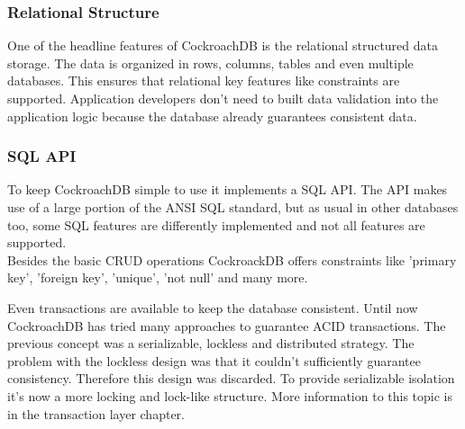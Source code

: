 \subsubsection{Relational Structure}
One of the headline features of CockroachDB is the relational structured data storage. The data is organized in rows, columns, tables and even multiple databases. This ensures that relational key features like constraints are supported. Application developers don't need to built data validation into the application logic because the database already guarantees consistent data.

\subsubsection{SQL API}
To keep CockroachDB simple to use it implements a SQL API. The API makes use of a large portion of the ANSI SQL standard, but
as usual in other databases too, some SQL features are differently implemented and not all features are supported. \\
Besides the basic CRUD operations CockroackDB offers constraints like 'primary key', 'foreign key', 'unique', 'not null' and
many more.

Even transactions are available to keep the database consistent. Until now CockroachDB has tried many approaches to guarantee
ACID transactions. The previous concept was a serializable, lockless and distributed strategy. 
The problem with the lockless design was that it couldn't sufficiently guarantee consistency. Therefore this design was 
discarded. To provide serializable isolation it's now a more locking and lock-like structure. 
More information to this topic is in the transaction layer chapter.

